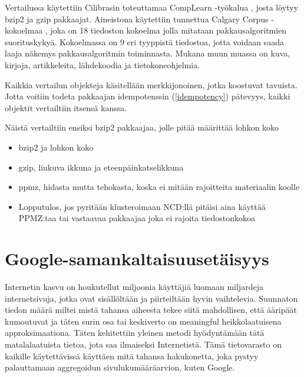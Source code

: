 \documentclass[12pt,finnish]{tktltiki2}
\theoremstyle{definition}
\theoremstyle{remark}
\begin{document}
      Vertailussa käytettiin Cilibrasin toteuttamaa CompLearn -työkalua \cite{complearn}, josta löytyy bzip2 ja gzip pakkaajat. Aineistona käytettiin tunnettua Calgary Corpus -kokoelmaa \cite{calgarycorpus}, joka on 18 tiedoston kokoelma jolla mitataan pakkausalgoritmien suorituskykyä. Kokoelmassa on 9 eri tyyppistä tiedostoa, jotta voidaan saada laaja näkemys pakkausalgoritmin toiminnasta. Mukana muun muassa on kuva, kirjoja, artikkeleita, lähdekoodia ja tietokoneohjelmia.

      Kaikkia vertailun objekteja käsitellään merkkijonoinen, jotka koostuvat tavuista. Jotta voitiin todeta pakkaajan idempotenssin (\ref{idempotency}) pätevyys, kaikki objektit vertailtiin itsensä kanssa.

      Näistä vertailtiin ensiksi bzip2 pakkaajaa, jolle pitää määrittää lohkon koko

    \begin{itemize}
      \item bzip2 ja lohkon koko
      \item gzip, liukuva ikkuna ja eteenpäinkatselikkuna
      \item ppmz, hidasta mutta tehokasta, koska ei mitään rajoitteita materiaalin koolle
      \item Lopputulos, jos pyritään klusteroimaan NCD:llä pitäisi aina käyttää PPMZ:taa tai vastaavaa pakkaajaa joka ei rajoita tiedostonkokoa
    \end{itemize}




\section{Google-samankaltaisuusetäisyys} %
  \label{sec:google_similarity_distance}


    Internetin kasvu on houkutellut miljoonia käyttäjiä luomaan miljardeja internetsivuja, jotka ovat sisällöltään ja piirteiltään hyvin vaihtelevia. Suunnaton tiedon määrä miltei mistä tahansa aiheesta tekee siitä mahdollisen, että ääripäät kumoutuvat ja täten surin osa tai keskiverto on meaningful heikkolaatuisena approksimaationa. Täten kehitettiin yleinen metodi hyödyntämään tätä matalalaatuista tietoa, jota saa ilmaiseksi Internetistä. Tämä tietovarasto on kaikille käytettävissä käyttäen mitä tahansa hakukonetta, joka pystyy palauttamaan aggregoidun sivulukumääräarvion, kuten Google.
\end{document}
